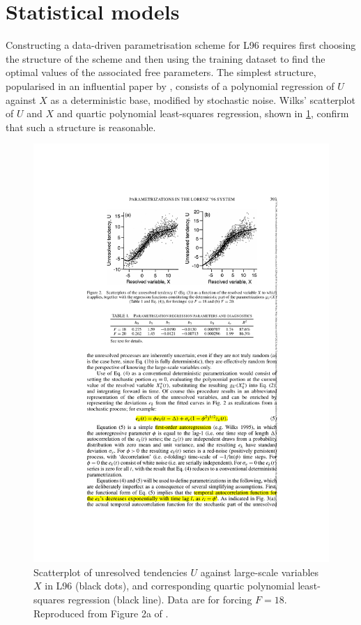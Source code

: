 \documentclass[../main.tex]{subfiles}
\begin{document}
\section{Statistical models} \label{sec:l96_statmodels} Constructing a
data-driven parametrisation scheme for L96 requires first choosing the
structure of the scheme and then using the training dataset to find the optimal
values of the associated free parameters. The simplest structure, popularised
in an influential paper by \textcite{wilks2005}, consists of a polynomial
regression of $U$ against $X$ as a deterministic base, modified by stochastic
noise. Wilks' scatterplot of $U$ and $X$ and quartic polynomial least-squares
regression, shown in \cref{fig:wilks2005_regression}, confirm that such a
structure is reasonable.

\begin{figure}[ht]
    \centering
    \includegraphics[width=0.3\linewidth]{figures/wilks2005_regression.pdf}
    \caption{ Scatterplot of unresolved tendencies $U$ against large-scale
        variables $X$ in L96 (black dots), and corresponding quartic polynomial
        least-squares regression (black line). Data are for forcing $F=18$.
        Reproduced from Figure 2a of \textcite{wilks2005}. }
    \label{fig:wilks2005_regression}
\end{figure}
\end{document}
